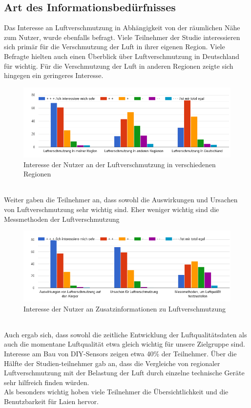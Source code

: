 \subsection{Art des Informationsbedürfnisses}
Das Interesse an \gls{Luftverschmutzung} in Abhängigkeit von der räumlichen Nähe zum Nutzer, wurde ebenfalls befragt.
Viele Teilnehmer der Studie interessieren sich primär für die Verschmutzung der Luft in ihrer eigenen Region. Viele Befragte hielten auch einen Überblick über \gls{Luftverschmutzung} in Deutschland für wichtig. Für die Verschmutzung der Luft in anderen Regionen zeigte sich hingegen ein geringeres Interesse.
\\
\begin{figure}[h]
    \centering
    \includegraphics[width=1\textwidth]{media/diagram/interesse.png}
    \caption{Interesse der Nutzer an der Luftverschmutzung in verschiedenen Regionen}
\end{figure}
\\
Weiter gaben die Teilnehmer an,  dass sowohl die Auswirkungen und Ursachen von \gls{Luftverschmutzung} sehr wichtig sind. Eher weniger wichtig sind die Messmethoden der Luftverschmutzung
\\
\begin{figure}[h]
    \centering
    \includegraphics[width=1\textwidth]{media/diagram/interesse2.png}
    \caption{Interesse der Nutzer an Zusatzinformationen zu Luftverschmutzung}
\end{figure}
\\
Auch ergab sich, dass sowohl die zeitliche Entwicklung der Luftqualitätsdaten als auch die momentane Luftqualität etwa gleich wichtig für unsere Zielgruppe sind. Interesse am Bau von \gls{DIY}-\glspl{Sensor} zeigen etwa 40\%  der Teilnehmer.
Über die Hälfte der Studien-teilnehmer gab an, dass die Vergleiche von regionaler \gls{Luftverschmutzung} mit der Belastung der Luft durch einzelne technische Geräte sehr hilfreich finden würden.
\\
Als besonders wichtig hoben viele Teilnehmer die Übersichtlichkeit und die Benutzbarkeit für Laien hervor.

